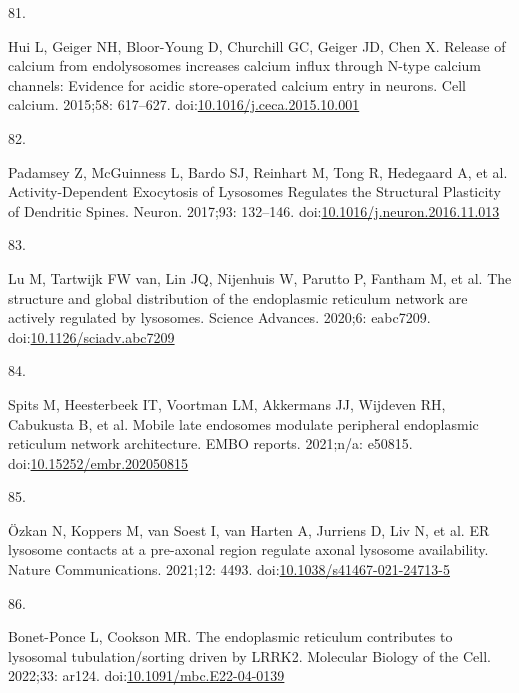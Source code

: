 \documentclass[
  12pt,
  a4paper,
]{book}
\newlength{\cslhangindent}
\newlength{\csllabelwidth}
\newlength{\cslentryspacingunit} %
\newenvironment{CSLReferences}[2] %
 {%
  \setlength{\parindent}{0pt}
  \ifodd #1
  \let\oldpar\par
  \def\par{\hangindent=\cslhangindent\oldpar}
  \fi
  \setlength{\parskip}{#2\cslentryspacingunit}
 }%
 {}
\newcommand{\CSLLeftMargin}[1]{\parbox[t]{\csllabelwidth}{#1}}
\newcommand{\CSLRightInline}[1]{\parbox[t]{\linewidth - \csllabelwidth}{#1}\break}
\begin{document}
\begin{CSLReferences}{0}{0}
\leavevmode{}%
\CSLLeftMargin{81. }%
\CSLRightInline{Hui L, Geiger NH, Bloor-Young D, Churchill GC, Geiger JD, Chen X. Release of calcium from endolysosomes increases calcium influx through {N-type} calcium channels: {Evidence} for acidic store-operated calcium entry in neurons. Cell calcium. 2015;58: 617--627. doi:\href{https://doi.org/10.1016/j.ceca.2015.10.001}{10.1016/j.ceca.2015.10.001}}

\leavevmode{}%
\CSLLeftMargin{82. }%
\CSLRightInline{Padamsey Z, McGuinness L, Bardo SJ, Reinhart M, Tong R, Hedegaard A, et al. Activity-{Dependent Exocytosis} of {Lysosomes Regulates} the {Structural Plasticity} of {Dendritic Spines}. Neuron. 2017;93: 132--146. doi:\href{https://doi.org/10.1016/j.neuron.2016.11.013}{10.1016/j.neuron.2016.11.013}}

\leavevmode{}%
\CSLLeftMargin{83. }%
\CSLRightInline{Lu M, Tartwijk FW van, Lin JQ, Nijenhuis W, Parutto P, Fantham M, et al. The structure and global distribution of the endoplasmic reticulum network are actively regulated by lysosomes. Science Advances. 2020;6: eabc7209. doi:\href{https://doi.org/10.1126/sciadv.abc7209}{10.1126/sciadv.abc7209}}

\leavevmode{}%
\CSLLeftMargin{84. }%
\CSLRightInline{Spits M, Heesterbeek IT, Voortman LM, Akkermans JJ, Wijdeven RH, Cabukusta B, et al. Mobile late endosomes modulate peripheral endoplasmic reticulum network architecture. EMBO reports. 2021;n/a: e50815. doi:\href{https://doi.org/10.15252/embr.202050815}{10.15252/embr.202050815}}

\leavevmode{}%
\CSLLeftMargin{85. }%
\CSLRightInline{Özkan N, Koppers M, van Soest I, van Harten A, Jurriens D, Liv N, et al. {ER} \textendash{} lysosome contacts at a pre-axonal region regulate axonal lysosome availability. Nature Communications. 2021;12: 4493. doi:\href{https://doi.org/10.1038/s41467-021-24713-5}{10.1038/s41467-021-24713-5}}

\leavevmode{}%
\CSLLeftMargin{86. }%
\CSLRightInline{Bonet-Ponce L, Cookson MR. The endoplasmic reticulum contributes to lysosomal tubulation/sorting driven by {LRRK2}. Molecular Biology of the Cell. 2022;33: ar124. doi:\href{https://doi.org/10.1091/mbc.E22-04-0139}{10.1091/mbc.E22-04-0139}}


\end{CSLReferences}
\end{document}
